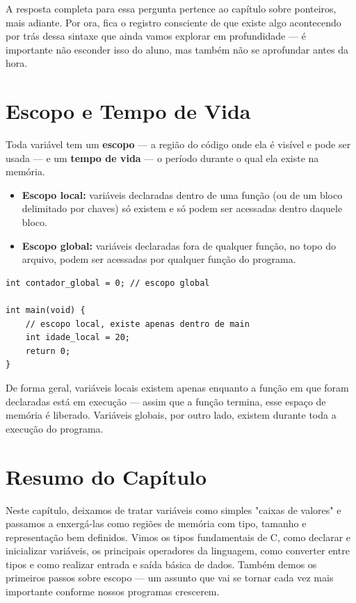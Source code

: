 A resposta completa para essa pergunta pertence ao capítulo sobre ponteiros, mais adiante. Por ora, fica o registro consciente de que existe algo acontecendo por trás dessa sintaxe que ainda vamos explorar em profundidade — é importante não esconder isso do aluno, mas também não se aprofundar antes da hora.

\section{Escopo e Tempo de Vida}
Toda variável tem um \textbf{escopo} — a região do código onde ela é visível e pode ser usada — e um \textbf{tempo de vida} — o período durante o qual ela existe na memória.

\begin{itemize}
    \item \textbf{Escopo local:} variáveis declaradas dentro de uma função (ou de um bloco delimitado por chaves) só existem e só podem ser acessadas dentro daquele bloco.
    \item \textbf{Escopo global:} variáveis declaradas fora de qualquer função, no topo do arquivo, podem ser acessadas por qualquer função do programa.
\end{itemize}

\begin{lstlisting}
int contador_global = 0; // escopo global

int main(void) {
    // escopo local, existe apenas dentro de main
    int idade_local = 20; 
    return 0;
}
\end{lstlisting}

De forma geral, variáveis locais existem apenas enquanto a função em que foram declaradas está em execução — assim que a função termina, esse espaço de memória é liberado. Variáveis globais, por outro lado, existem durante toda a execução do programa.


\section*{Resumo do Capítulo}
Neste capítulo, deixamos de tratar variáveis como simples "caixas de valores" e passamos a enxergá-las como regiões de memória com tipo, tamanho e representação bem definidos. Vimos os tipos fundamentais de C, como declarar e inicializar variáveis, os principais operadores da linguagem, como converter entre tipos e como realizar entrada e saída básica de dados. Também demos os primeiros passos sobre escopo — um assunto que vai se tornar cada vez mais importante conforme nossos programas crescerem.

